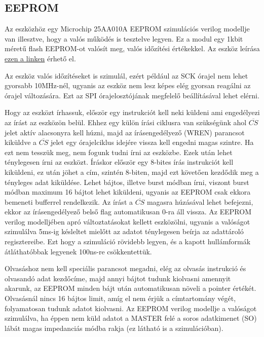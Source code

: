 \documentclass[a4paper,11pt]{article}
\begin{document}
\subsection{EEPROM}
Az eszközhöz egy Microchip 25AA010A EEPROM szimulációs verilog modellje van illesztve, hogy a valós működés is tesztelve legyen. Ez a modul egy 1kbit méretű flash EEPROM-ot valósít meg, valós időzítési értékekkel. Az eszköz leírása \href{http://ww1.microchip.com/downloads/en/DeviceDoc/21832H.pdf}{ezen a linken} érhető el.

Az eszköz valós időzítéseket is szimulál, ezért például az SCK órajel nem lehet gyorsabb 10MHz-nél, ugyanis az eszköz nem lesz képes elég gyorsan reagálni az órajel változására. Ezt az SPI órajelosztójának megfelelő beállításával lehet elérni.

Hogy az eszközt írhassuk, először egy instrukciót kell neki küldeni ami engedélyezi az írást az eszközön belül. Ehhez egy külön írási ciklusra van szükségünk ahol $\overline{CS}$ jelet aktív alacsonyra kell húzni, majd az írásengedélyező (WREN) parancsot kiküldve a $\overline{CS}$ jelet egy órajelciklus idejére vissza kell engedni magas szintre. Ha ezt nem tesszük meg, nem fogunk tudni írni az eszközbe. Ezek után lehet ténylegesen írni az eszközt. Íráskor először egy 8-bites írás instrukciót kell kiküldeni, ez után jöhet a cím, szintén 8-biten, majd ezt követően kezdődik meg a tényleges adat kiküldése. Lehet bájtos, illetve burst módban írni, viszont burst módban maximum 16 bájtot lehet kiküldeni, ugyanis az EEPROM csak ekkora bemeneti bufferrel rendelkezik. Az írást a $\overline{CS}$ magasra húzásával lehet befejezni, ekkor az írásengedélyező belső flag automatikusan 0-ra áll vissza. Az EEPROM verilog modelljében apró változtatásokat kellett eszközölni, ugyanis a valóságot szimulálva 5ms-ig késleltet mielőtt az adatot ténylegesen beírja az adattároló regisztereibe. Ezt hogy a szimuláció rövidebb legyen, és a kapott hullámformák átláthatóbbak legyenek 100ns-re csökkentettük.

Olvasáshoz nem kell speciális parancsot megadni, elég az olvasás instrukció és olvasandó adat kezdőcíme, majd annyi bájtot tudunk kiolvasni amennyit akarunk, az EEPROM minden bájt után automatikusan növeli a pointer értékét. Olvasásnál nincs 16 bájtos limit, amíg el nem érjük a címtartomány végét, folyamatosan tudunk adatot kiolvasni. Az EEPROM verilog modellje a valóságot szimulálva, ha éppen nem küld adatot a MASTER felé a soros adatkimenet (SO) lábát magas impedanciás módba rakja (ez látható is a szimulációban).
\end{document}
